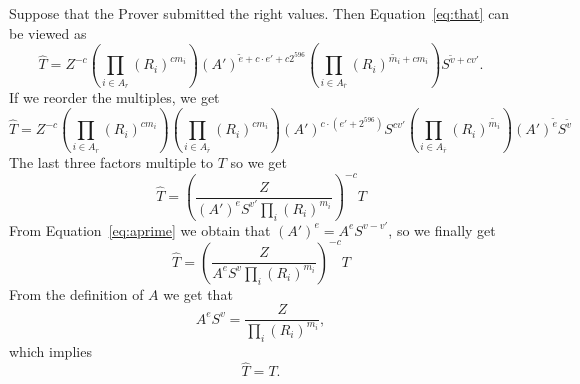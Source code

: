 \documentclass[a4paper]{article}
\begin{document}
Suppose that the Prover submitted the right values. Then Equation~\eqref{eq:that} can be viewed as
\begin{equation}
\widehat{T} = Z^{-c}\left(\prod_{i \in A_r}(R_i)^{cm_i}\right)
(A')^{ \widetilde{e}+c\cdot e'+c2^{596}} \left(\prod_{i\in A_{\overline{r}}}(R_i)^{ \widetilde{m_i} + cm_i}\right)
S^{\widetilde{v}+cv'}.
\end{equation}
If we reorder the multiples, we get
\begin{equation}
\widehat{T} = Z^{-c}\left(\prod_{i \in A_r}(R_i)^{cm_i}\right)\left(\prod_{i\in A_{\overline{r}}}(R_i)^{ cm_i}\right)
(A')^{ c\cdot (e'+2^{596})}
S^{cv'}
\left(\prod_{i\in A_{\overline{r}}}(R_i)^{ \widetilde{m_i}}\right)(A')^{ \widetilde{e}}
S^{\widetilde{v}}
\end{equation}
The last three factors multiple to $T$ so we get
\begin{equation}
\widehat{T} =\left(\frac{Z}{(A')^{e}S^{v'}\prod_i (R_i)^{m_i}}\right)^{-c}T
\end{equation}
From Equation~\eqref{eq:aprime} we obtain that
$(A')^e =A^e S^{v-v'}$, so we finally get
\begin{equation}
\widehat{T} =\left(\frac{Z}{A^{e}S^{v}\prod_i (R_i)^{m_i}}\right)^{-c}T
\end{equation} 
From the definition of $A$ we get that
\begin{equation}
A^e S^v = \frac{Z}{\prod_i (R_i)^{m_i}},
\end{equation}
which implies
$$
\widehat{T} = T.
$$
\end{document}
